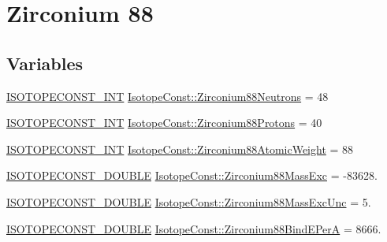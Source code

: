 \hypertarget{group___isotope_const-_zirconium-_zr88}{}\section{Zirconium 88}
\label{group___isotope_const-_zirconium-_zr88}
\subsection*{Variables}
\begin{DoxyCompactItemize}
\item 
\mbox{\hyperlink{group___isotope_const-_macros_ga5f18360b3e99483a35c32d789e62621c}{I\+S\+O\+T\+O\+P\+E\+C\+O\+N\+S\+T\+\_\+\+I\+NT}} \mbox{\hyperlink{group___isotope_const-_zirconium-_zr88_gaee0dcdb4fcacce93c234ca2256b0d61f}{Isotope\+Const\+::\+Zirconium88\+Neutrons}} = 48
\item 
\mbox{\hyperlink{group___isotope_const-_macros_ga5f18360b3e99483a35c32d789e62621c}{I\+S\+O\+T\+O\+P\+E\+C\+O\+N\+S\+T\+\_\+\+I\+NT}} \mbox{\hyperlink{group___isotope_const-_zirconium-_zr88_ga128b96e94a487cdf86ef50dcef766bf3}{Isotope\+Const\+::\+Zirconium88\+Protons}} = 40
\item 
\mbox{\hyperlink{group___isotope_const-_macros_ga5f18360b3e99483a35c32d789e62621c}{I\+S\+O\+T\+O\+P\+E\+C\+O\+N\+S\+T\+\_\+\+I\+NT}} \mbox{\hyperlink{group___isotope_const-_zirconium-_zr88_gae5e47bf7f2a925a42b589ca7d0270708}{Isotope\+Const\+::\+Zirconium88\+Atomic\+Weight}} = 88
\item 
\mbox{\hyperlink{group___isotope_const-_macros_ga8f45a7272ce02c0b4c65c44636ed719a}{I\+S\+O\+T\+O\+P\+E\+C\+O\+N\+S\+T\+\_\+\+D\+O\+U\+B\+LE}} \mbox{\hyperlink{group___isotope_const-_zirconium-_zr88_gae324fd5dab1c732ce13b87a54985ad2e}{Isotope\+Const\+::\+Zirconium88\+Mass\+Exc}} = -\/83628.
\item 
\mbox{\hyperlink{group___isotope_const-_macros_ga8f45a7272ce02c0b4c65c44636ed719a}{I\+S\+O\+T\+O\+P\+E\+C\+O\+N\+S\+T\+\_\+\+D\+O\+U\+B\+LE}} \mbox{\hyperlink{group___isotope_const-_zirconium-_zr88_ga51962075cd68997b751f70e1df6dba8d}{Isotope\+Const\+::\+Zirconium88\+Mass\+Exc\+Unc}} = 5.
\item 
\mbox{\hyperlink{group___isotope_const-_macros_ga8f45a7272ce02c0b4c65c44636ed719a}{I\+S\+O\+T\+O\+P\+E\+C\+O\+N\+S\+T\+\_\+\+D\+O\+U\+B\+LE}} \mbox{\hyperlink{group___isotope_const-_zirconium-_zr88_ga73039d052c4449954a5e25e57ad2eab1}{Isotope\+Const\+::\+Zirconium88\+Bind\+E\+PerA}} = 8666.
\item 

\end{DoxyCompactItemize}
